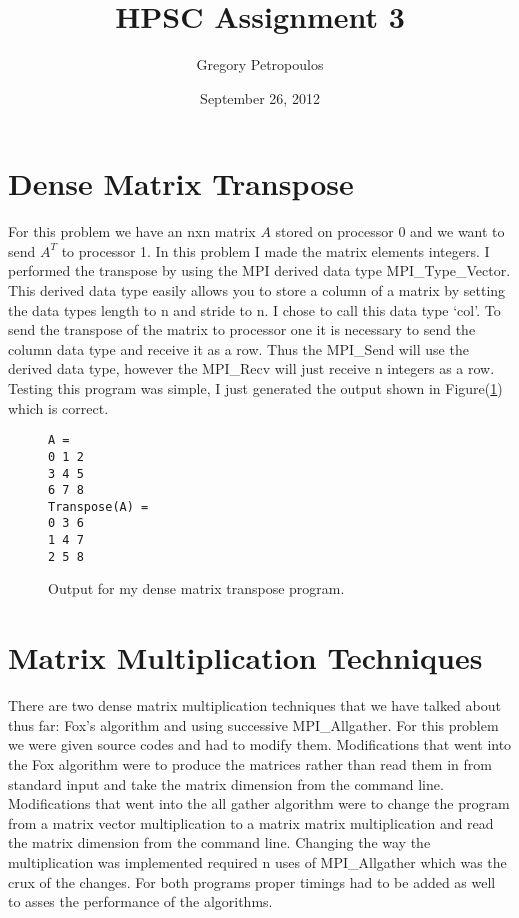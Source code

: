 \documentclass[11pt,a4paper,oneside]{report}
\begin{document}
\title{HPSC Assignment 3}
\author{Gregory Petropoulos}
\date{September 26, 2012}
\maketitle

\section{Dense Matrix Transpose}

For this problem we have an nxn matrix $A$ stored on processor 0 and we want to send $A^T$ to processor 1.  In this problem I made the matrix elements integers.  I performed the transpose by using the MPI derived data type MPI\_Type\_Vector.  This derived data type easily allows you to store a column of a matrix by setting the data types length to n and stride to n.  I chose to call this data type `col'.  To send the transpose of the matrix to processor one it is necessary to send the column data type and receive it as a row.  Thus the MPI\_Send will use the derived data type, however the MPI\_Recv will just receive n integers as a row.  Testing this program was simple, I just generated the output shown in Figure(\ref{fig:transpose}) which is correct.

\begin{figure}[htpb]
  \texttt{A =\\}
  \texttt{0 1 2 \\}
  \texttt{3 4 5 \\}
  \texttt{6 7 8 \\}
  \texttt{Transpose(A) =\\}
  \texttt{0 3 6 \\}
  \texttt{1 4 7 \\}
  \texttt{2 5 8 \\}
  \caption{Output for my dense matrix transpose program.}
  \label{fig:transpose}
\end{figure}

\section{Matrix Multiplication Techniques}

There are two dense matrix multiplication techniques that we have talked about thus far:  Fox's algorithm and using successive MPI\_Allgather.  For this problem we were given source codes and had to modify them.  Modifications that went into the Fox algorithm were to produce the matrices rather than read them in from standard input and take the matrix dimension from the command line.  Modifications that went into the all gather algorithm were to change the program from a matrix vector multiplication to a matrix matrix multiplication and read the matrix dimension from the command line.  Changing the way the multiplication was implemented required n uses of MPI\_Allgather which was the crux of the changes.  For both programs proper timings had to be added as well to asses the performance of the algorithms.
\end{document}
